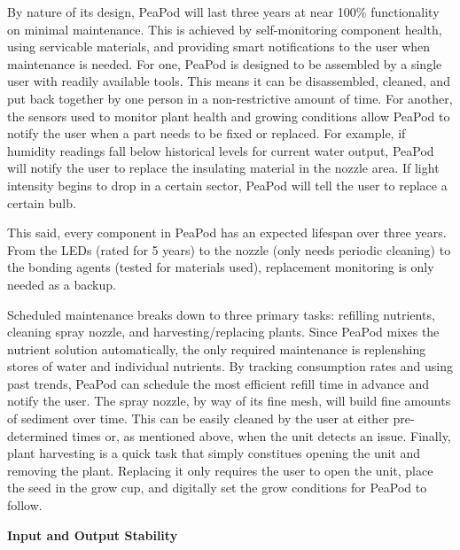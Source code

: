 \documentclass{report}
\begin{document}
By nature of its design, PeaPod will last three years at near 100\% functionality on minimal maintenance.
This is achieved by self-monitoring component health, using servicable materials, and providing smart notifications to the user when maintenance is needed.
For one, PeaPod is designed to be assembled by a single user with readily available tools. This means it can be disassembled, cleaned, and put back together by one person in a non-restrictive amount of time.
For another, the sensors used to monitor plant health and growing conditions allow PeaPod to notify the user when a part needs to be fixed or replaced. For example, if humidity readings fall below historical levels for current water output, PeaPod will notify the user to replace the insulating material in the nozzle area. If light intensity begins to drop in a certain sector, PeaPod will tell the user to replace a certain bulb.

This said, every component in PeaPod has an expected lifespan over three years. From the LEDs (rated for 5 years) to the nozzle (only needs periodic cleaning) to the bonding agents (tested for materials used), replacement monitoring is only needed as a backup.

Scheduled maintenance breaks down to three primary tasks: refilling nutrients, cleaning spray nozzle, and harvesting/replacing plants.
Since PeaPod mixes the nutrient solution automatically, the only required maintenance is replenshing stores of water and individual nutrients. By tracking consumption rates and using past trends, PeaPod can schedule the most efficient refill time in advance and notify the user.
The spray nozzle, by way of its fine mesh, will build fine amounts of sediment over time. This can be easily cleaned by the user at either pre-determined times or, as mentioned above, when the unit detects an issue.
Finally, plant harvesting is a quick task that simply constitues opening the unit and removing the plant. Replacing it only requires the user to open the unit, place the seed in the grow cup, and digitally set the grow conditions for PeaPod to follow.

\textbf{Input and Output Stability}
\end{document}
